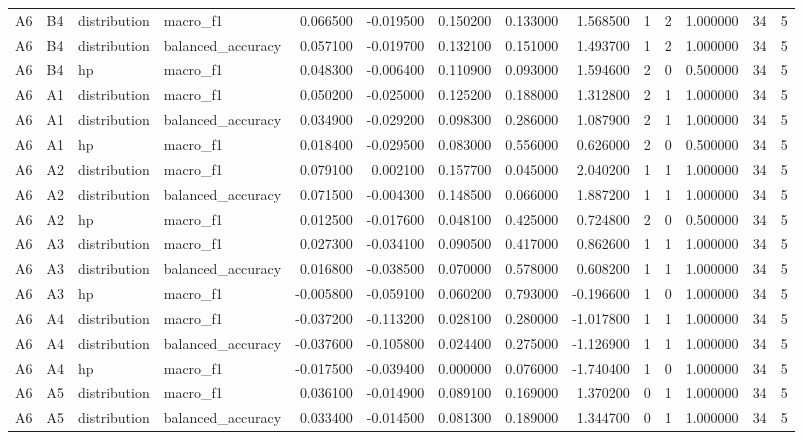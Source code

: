 \begin{table}
\begin{tabular}{llllrrrrrrrrrr}
A6 & B4 & distribution & macro\_f1 & 0.066500 & -0.019500 & 0.150200 & 0.133000 & 1.568500 & 1 & 2 & 1.000000 & 34 & 5 \\
A6 & B4 & distribution & balanced\_accuracy & 0.057100 & -0.019700 & 0.132100 & 0.151000 & 1.493700 & 1 & 2 & 1.000000 & 34 & 5 \\
A6 & B4 & hp & macro\_f1 & 0.048300 & -0.006400 & 0.110900 & 0.093000 & 1.594600 & 2 & 0 & 0.500000 & 34 & 5 \\
A6 & A1 & distribution & macro\_f1 & 0.050200 & -0.025000 & 0.125200 & 0.188000 & 1.312800 & 2 & 1 & 1.000000 & 34 & 5 \\
A6 & A1 & distribution & balanced\_accuracy & 0.034900 & -0.029200 & 0.098300 & 0.286000 & 1.087900 & 2 & 1 & 1.000000 & 34 & 5 \\
A6 & A1 & hp & macro\_f1 & 0.018400 & -0.029500 & 0.083000 & 0.556000 & 0.626000 & 2 & 0 & 0.500000 & 34 & 5 \\
A6 & A2 & distribution & macro\_f1 & 0.079100 & 0.002100 & 0.157700 & 0.045000 & 2.040200 & 1 & 1 & 1.000000 & 34 & 5 \\
A6 & A2 & distribution & balanced\_accuracy & 0.071500 & -0.004300 & 0.148500 & 0.066000 & 1.887200 & 1 & 1 & 1.000000 & 34 & 5 \\
A6 & A2 & hp & macro\_f1 & 0.012500 & -0.017600 & 0.048100 & 0.425000 & 0.724800 & 2 & 0 & 0.500000 & 34 & 5 \\
A6 & A3 & distribution & macro\_f1 & 0.027300 & -0.034100 & 0.090500 & 0.417000 & 0.862600 & 1 & 1 & 1.000000 & 34 & 5 \\
A6 & A3 & distribution & balanced\_accuracy & 0.016800 & -0.038500 & 0.070000 & 0.578000 & 0.608200 & 1 & 1 & 1.000000 & 34 & 5 \\
A6 & A3 & hp & macro\_f1 & -0.005800 & -0.059100 & 0.060200 & 0.793000 & -0.196600 & 1 & 0 & 1.000000 & 34 & 5 \\
A6 & A4 & distribution & macro\_f1 & -0.037200 & -0.113200 & 0.028100 & 0.280000 & -1.017800 & 1 & 1 & 1.000000 & 34 & 5 \\
A6 & A4 & distribution & balanced\_accuracy & -0.037600 & -0.105800 & 0.024400 & 0.275000 & -1.126900 & 1 & 1 & 1.000000 & 34 & 5 \\
A6 & A4 & hp & macro\_f1 & -0.017500 & -0.039400 & 0.000000 & 0.076000 & -1.740400 & 1 & 0 & 1.000000 & 34 & 5 \\
A6 & A5 & distribution & macro\_f1 & 0.036100 & -0.014900 & 0.089100 & 0.169000 & 1.370200 & 0 & 1 & 1.000000 & 34 & 5 \\
A6 & A5 & distribution & balanced\_accuracy & 0.033400 & -0.014500 & 0.081300 & 0.189000 & 1.344700 & 0 & 1 & 1.000000 & 34 & 5 \\

\end{tabular}
\end{table}
